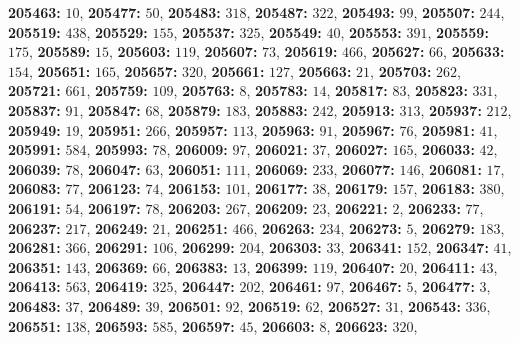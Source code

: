 \textsf{\bfseries 205463:} $10$, \textsf{\bfseries 205477:} $50$, \textsf{\bfseries 205483:} $318$, \textsf{\bfseries 205487:} $322$, \textsf{\bfseries 205493:} $99$, \textsf{\bfseries 205507:} $244$, \textsf{\bfseries 205519:} $438$, \textsf{\bfseries 205529:} $155$, \textsf{\bfseries 205537:} $325$, \textsf{\bfseries 205549:} $40$, \textsf{\bfseries 205553:} $391$, \textsf{\bfseries 205559:} $175$, \textsf{\bfseries 205589:} $15$, \textsf{\bfseries 205603:} $119$, \textsf{\bfseries 205607:} $73$, \textsf{\bfseries 205619:} $466$, \textsf{\bfseries 205627:} $66$, \textsf{\bfseries 205633:} $154$, \textsf{\bfseries 205651:} $165$, \textsf{\bfseries 205657:} $320$, \textsf{\bfseries 205661:} $127$, \textsf{\bfseries 205663:} $21$, \textsf{\bfseries 205703:} $262$, \textsf{\bfseries 205721:} $661$, \textsf{\bfseries 205759:} $109$, \textsf{\bfseries 205763:} $8$, \textsf{\bfseries 205783:} $14$, \textsf{\bfseries 205817:} $83$, \textsf{\bfseries 205823:} $331$, \textsf{\bfseries 205837:} $91$, \textsf{\bfseries 205847:} $68$, \textsf{\bfseries 205879:} $183$, \textsf{\bfseries 205883:} $242$, \textsf{\bfseries 205913:} $313$, \textsf{\bfseries 205937:} $212$, \textsf{\bfseries 205949:} $19$, \textsf{\bfseries 205951:} $266$, \textsf{\bfseries 205957:} $113$, \textsf{\bfseries 205963:} $91$, \textsf{\bfseries 205967:} $76$, \textsf{\bfseries 205981:} $41$, \textsf{\bfseries 205991:} $584$, \textsf{\bfseries 205993:} $78$, \textsf{\bfseries 206009:} $97$, \textsf{\bfseries 206021:} $37$, \textsf{\bfseries 206027:} $165$, \textsf{\bfseries 206033:} $42$, \textsf{\bfseries 206039:} $78$, \textsf{\bfseries 206047:} $63$, \textsf{\bfseries 206051:} $111$, \textsf{\bfseries 206069:} $233$, \textsf{\bfseries 206077:} $146$, \textsf{\bfseries 206081:} $17$, \textsf{\bfseries 206083:} $77$, \textsf{\bfseries 206123:} $74$, \textsf{\bfseries 206153:} $101$, \textsf{\bfseries 206177:} $38$, \textsf{\bfseries 206179:} $157$, \textsf{\bfseries 206183:} $380$, \textsf{\bfseries 206191:} $54$, \textsf{\bfseries 206197:} $78$, \textsf{\bfseries 206203:} $267$, \textsf{\bfseries 206209:} $23$, \textsf{\bfseries 206221:} $2$, \textsf{\bfseries 206233:} $77$, \textsf{\bfseries 206237:} $217$, \textsf{\bfseries 206249:} $21$, \textsf{\bfseries 206251:} $466$, \textsf{\bfseries 206263:} $234$, \textsf{\bfseries 206273:} $5$, \textsf{\bfseries 206279:} $183$, \textsf{\bfseries 206281:} $366$, \textsf{\bfseries 206291:} $106$, \textsf{\bfseries 206299:} $204$, \textsf{\bfseries 206303:} $33$, \textsf{\bfseries 206341:} $152$, \textsf{\bfseries 206347:} $41$, \textsf{\bfseries 206351:} $143$, \textsf{\bfseries 206369:} $66$, \textsf{\bfseries 206383:} $13$, \textsf{\bfseries 206399:} $119$, \textsf{\bfseries 206407:} $20$, \textsf{\bfseries 206411:} $43$, \textsf{\bfseries 206413:} $563$, \textsf{\bfseries 206419:} $325$, \textsf{\bfseries 206447:} $202$, \textsf{\bfseries 206461:} $97$, \textsf{\bfseries 206467:} $5$, \textsf{\bfseries 206477:} $3$, \textsf{\bfseries 206483:} $37$, \textsf{\bfseries 206489:} $39$, \textsf{\bfseries 206501:} $92$, \textsf{\bfseries 206519:} $62$, \textsf{\bfseries 206527:} $31$, \textsf{\bfseries 206543:} $336$, \textsf{\bfseries 206551:} $138$, \textsf{\bfseries 206593:} $585$, \textsf{\bfseries 206597:} $45$, \textsf{\bfseries 206603:} $8$, \textsf{\bfseries 206623:} $320$, 

